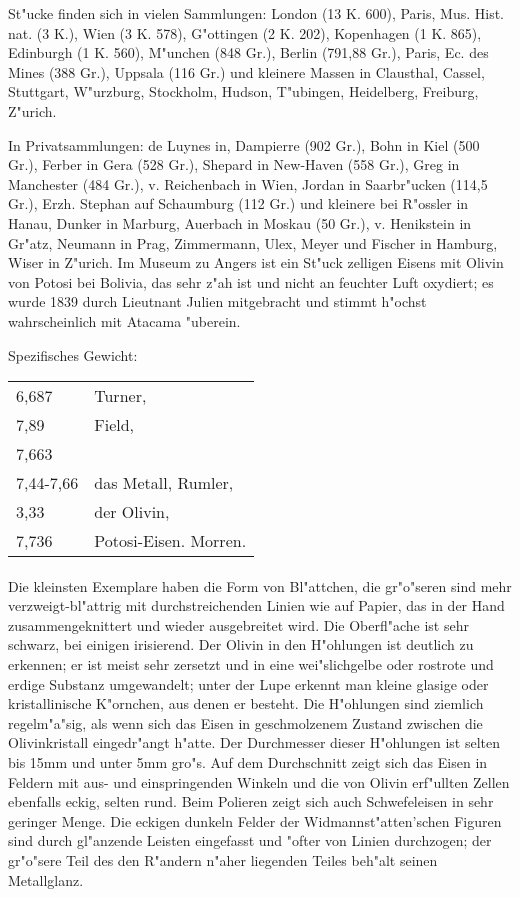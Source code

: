 \documentclass[a4paper, 11pt, oneside]{article}
\begin{document}
St"ucke finden sich in vielen Sammlungen: London (13 K. 600), Paris, Mus. Hist. nat. (3 K.), Wien (3 K. 578), G"ottingen (2 K. 202), Kopenhagen (1 K. 865), Edinburgh (1 K. 560), M"unchen (848 Gr.), Berlin (791,88 Gr.), Paris, Ec. des Mines (388 Gr.), Uppsala (116 Gr.) und kleinere Massen in Clausthal, Cassel, Stuttgart, W"urzburg, Stockholm, Hudson, T"ubingen, Heidelberg, Freiburg, Z"urich.

In Privatsammlungen: de Luynes in, Dampierre (902 Gr.), Bohn in Kiel (500 Gr.), Ferber in Gera (528 Gr.), Shepard in New-Haven (558 Gr.), Greg in Manchester (484 Gr.), v. Reichenbach in Wien, Jordan in Saarbr"ucken (114,5 Gr.), Erzh. Stephan auf Schaumburg (112 Gr.) und kleinere bei R"ossler in Hanau, Dunker in Marburg, Auerbach in Moskau (50 Gr.), v. Henikstein in Gr"atz, Neumann in Prag, Zimmermann, Ulex, Meyer und Fischer in Hamburg, Wiser in Z"urich. Im Museum zu Angers ist ein St"uck zelligen Eisens mit Olivin von Potosi bei Bolivia, das sehr z"ah ist und nicht an feuchter Luft oxydiert; es wurde 1839 durch Lieutnant Julien mitgebracht und stimmt h"ochst wahrscheinlich mit Atacama "uberein.

Spezifisches Gewicht:  
\begin{table}[!ht]
    \centering
    \begin{tabular}{l l}
        6,687 & Turner,\\
        7,89 & Field,\\
        7,663 & \\
        7,44-7,66 & das Metall, Rumler,\\
        3,33 & der Olivin,\\
        7,736 & Potosi-Eisen. Morren.
    \end{tabular}
\end{table}
\paragraph{}
Die kleinsten Exemplare haben die Form von Bl"attchen, die gr"o"seren sind mehr verzweigt-bl"attrig mit durchstreichenden Linien wie auf Papier, das in der Hand zusammengeknittert und wieder ausgebreitet wird. Die Oberfl"ache ist sehr schwarz, bei einigen irisierend. Der Olivin in den H"ohlungen ist deutlich zu erkennen; er ist meist sehr zersetzt und in eine wei"slichgelbe oder rostrote und erdige Substanz umgewandelt; unter der Lupe erkennt man kleine glasige oder kristallinische K"ornchen, aus denen er besteht. Die H"ohlungen sind ziemlich regelm"a"sig, als wenn sich das Eisen in geschmolzenem Zustand zwischen die Olivinkristall eingedr"angt h"atte. Der Durchmesser dieser H"ohlungen ist selten bis 15mm und unter 5mm gro"s. Auf dem Durchschnitt zeigt sich das Eisen in Feldern mit aus- und einspringenden Winkeln und die von Olivin erf"ullten Zellen ebenfalls eckig, selten rund. Beim Polieren zeigt sich auch Schwefeleisen in sehr geringer Menge. Die eckigen dunkeln Felder der Widmannst"atten'schen Figuren sind durch gl"anzende Leisten eingefasst und "ofter von Linien durchzogen; der gr"o"sere Teil des den R"andern n"aher liegenden Teiles beh"alt seinen Metallglanz.
\end{document}
